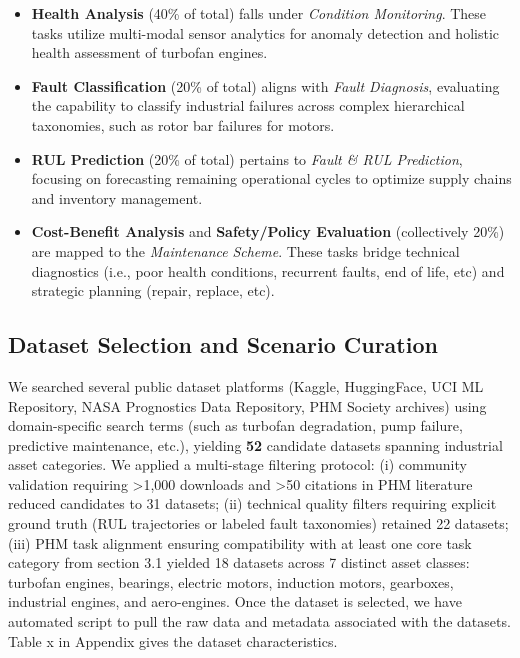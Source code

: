 \documentclass[sigconf]{acmart}
\begin{document}
\begin{itemize} \item \textbf{Health Analysis} (40\% of total) falls under \textit{Condition Monitoring}. These tasks utilize multi-modal sensor analytics for anomaly detection and holistic health assessment of turbofan engines.

\item \textbf{Fault Classification} (20\% of total) aligns with \textit{Fault Diagnosis}, evaluating the capability to classify industrial failures across complex hierarchical taxonomies, such as rotor bar failures for motors. 

\item \textbf{RUL Prediction} (20\% of total) pertains to \textit{Fault \& RUL Prediction}, focusing on forecasting remaining operational cycles to optimize supply chains and inventory management. 

\item \textbf{Cost-Benefit Analysis} and \textbf{Safety/Policy Evaluation} (collectively 20\%) are mapped to the \textit{Maintenance} \textit{Scheme}. These tasks bridge technical diagnostics (i.e., poor health conditions, recurrent faults, end of life, etc) and strategic planning (repair, replace, etc). 
\end{itemize}

\subsection{Dataset Selection and Scenario Curation} 
We searched several public dataset platforms (Kaggle, HuggingFace, UCI ML Repository, NASA Prognostics Data Repository, PHM Society archives) using domain-specific search terms (such as turbofan degradation, pump failure, predictive maintenance, etc.), yielding \textbf{52} candidate datasets spanning  industrial asset categories. We applied a multi-stage filtering protocol: (i) community validation requiring >1,000 downloads and >50 citations in PHM literature reduced candidates to 31 datasets; (ii) technical quality filters requiring explicit ground truth (RUL trajectories or labeled fault taxonomies) retained 22 datasets; (iii) PHM task alignment ensuring compatibility with at least one core task category from section 3.1 yielded 18 datasets across 7 distinct asset classes: turbofan engines, bearings, electric motors, induction motors, gearboxes, industrial engines, and aero-engines. Once the dataset is selected, we have automated script to pull the raw data and metadata associated with the datasets. Table x in Appendix gives the dataset characteristics.
\end{document}
